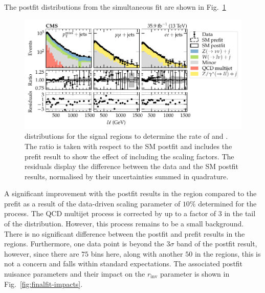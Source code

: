 The postfit distributions from the simultaneous fit are shown in Fig.~\ref{fig:finalfit-postfit}
%
\begin{figure}
    \centering
    \includegraphics{chapters/043_results/images/finalfit-postfit.pdf}
    \caption[Recoil distributions after a fit to the data between the signal and control regions.]{
        \recoil distributions for the signal regions to determine the rate of \IZvvj and \IZllj. The ratio is taken with respect to the SM postfit and includes the prefit result to show the effect of including the scaling factors. The residuals display the difference between the data and the SM postfit results, normalised by their uncertainties summed in quadrature.
    }
    \label{fig:finalfit-postfit}
\end{figure}
%
A significant improvement with the postfit results in the \ptmissplusjets region compared to the prefit as a result of the data-driven scaling parameter of $10\%$ determined for the \IWlvj process. The QCD multijet process is corrected by up to a factor of $3$ in the tail of the \recoil distribution.  However, this process remains to be a small background. There is no significant difference between the postfit and prefit results in the \diellplusjets regions. Furthermore, one data point is beyond the $3\sigma$ band of the postfit result, however, since there are $75$ bins here, along with another $50$ in the \ellplusjets regions, this is not a concern and falls within standard expectations. The associated postfit nuisance parameters and their impact on the $r_{\mathrm{inv}}$ parameter is shown in Fig.~\ref{fig:finalfit-impacts}.
%

